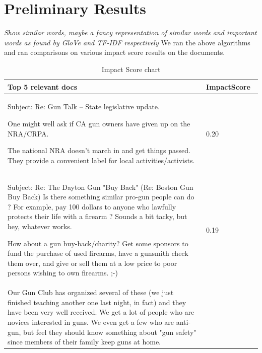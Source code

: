 \documentclass{article}
\begin{document}
\section{Preliminary Results} %
\textit{Show similar words, maybe a fancy representation of similar words and important words as found by GloVe and TF-IDF respectively}
We ran the above algorithms and ran comparisons on various impact score results on the documents.

\begin{table}[ht]
\caption{Impact Score chart} %
\centering %
\begin{tabular}{|p{10cm}|p{3cm}| } %
\hline\hline %
Top 5 relevant docs & ImpactScore\ \\ [0.5ex] %
\hline %
Subject: Re: Gun Talk -- State legislative update. 

One might well ask if CA gun owners have given up on the NRA/CRPA.

The national NRA doesn't march in and get things passed.  They provide
a convenient label for local activities/activists.
  & 0.20 \\ %
  
  \hline %
  Subject: Re: The Dayton Gun "Buy Back" (Re: Boston Gun Buy Back) 
  Is there something similar pro-gun people can do ?  For example, pay 100 dollars
 to anyone who lawfully protects their life with a firearm ?  Sounds a bit
 tacky, but hey, whatever works.

How about a gun buy-back/charity?  Get some sponsors to fund the
purchase of used firearms, have a gunsmith check them over, and give
or sell them at a low price to poor persons wishing to own firearms. ;-)

  & 0.19 \\ %
  \hline %
 Our Gun Club has organized several of these (we just finished
teaching another one last night, in fact) and they have been
very well received.  We get a lot of people who are novices
interested in guns.  We even get a few who are anti-gun, but
feel they should know something about "gun safety" since members
of their family keep guns at home.


\end{tabular}
\end{table}
\end{document}
